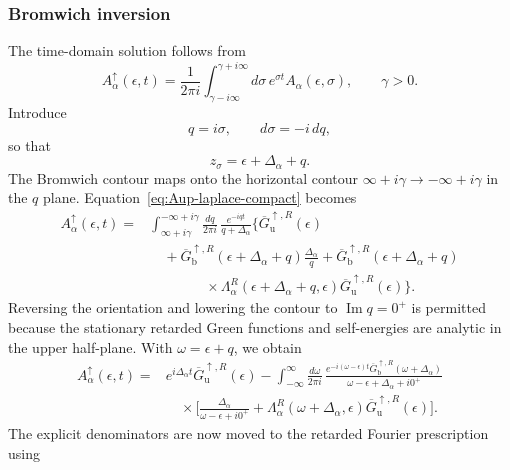 \documentclass[
 reprint,
 superscriptaddress,
 amsmath,amssymb,
 aps,prb,
 longbibliography,
 floatfix
]{revtex4-2}
\begin{document}
\subsubsection{Bromwich inversion}
\label{subsubsec:up-A-bromwich}

The time-domain solution follows from
\begin{equation*}
A_\alpha^{\uparrow}(\epsilon,t)
=
\frac{1}{2\pi i}
\int_{\gamma-i\infty}^{\gamma+i\infty}
d\sigma\,
e^{\sigma t}
A_\alpha(\epsilon,\sigma),
\qquad
\gamma>0.
\end{equation*}
Introduce
\begin{equation*}
q=i\sigma,
\qquad
d\sigma=-i\,dq,
\end{equation*}
so that
\begin{equation*}
z_\sigma=\epsilon+\Delta_\alpha+q.
\end{equation*}
The Bromwich contour maps onto the horizontal contour $\infty+i\gamma\rightarrow-\infty+i\gamma$ in the $q$ plane. Equation~\eqref{eq:Aup-laplace-compact} becomes
\begin{align*}
A_\alpha^{\uparrow}(\epsilon,t)
={}&
\int_{\infty+i\gamma}^{-\infty+i\gamma}
\frac{dq}{2\pi i}\,
\frac{e^{-iqt}}{q+\Delta_\alpha}
\Bigg\{
\overline G_{\mathrm u}^{\uparrow,R}(\epsilon)
\\
&\quad+
\overline G_{\mathrm b}^{\uparrow,R}
(\epsilon+\Delta_\alpha+q)
\frac{\Delta_\alpha}{q}
+
\overline G_{\mathrm b}^{\uparrow,R}
(\epsilon+\Delta_\alpha+q)
\\
&\qquad\qquad\times
\Lambda_\alpha^R
(\epsilon+\Delta_\alpha+q,\epsilon)
\overline G_{\mathrm u}^{\uparrow,R}(\epsilon)
\Bigg\}.
\end{align*}
Reversing the orientation and lowering the contour to $\operatorname{Im}q=0^+$ is permitted because the stationary retarded Green functions and self-energies are analytic in the upper half-plane. With $\omega=\epsilon+q$, we obtain
\begin{align*}
A_\alpha^{\uparrow}(\epsilon,t)
={}&
e^{i\Delta_\alpha t}
\overline G_{\mathrm u}^{\uparrow,R}(\epsilon)
-
\int_{-\infty}^{\infty}
\frac{d\omega}{2\pi i}\,
\frac{
e^{-i(\omega-\epsilon)t}
\overline G_{\mathrm b}^{\uparrow,R}
(\omega+\Delta_\alpha)}
{\omega-\epsilon+\Delta_\alpha+i0^+}
\\
&\quad\times
\Bigg[
\frac{\Delta_\alpha}
{\omega-\epsilon+i0^+}
+
\Lambda_\alpha^R
(\omega+\Delta_\alpha,\epsilon)
\overline G_{\mathrm u}^{\uparrow,R}(\epsilon)
\Bigg].
\end{align*}
The explicit denominators are now moved to the retarded Fourier prescription using
\end{document}
